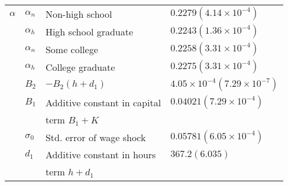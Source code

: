 \documentclass[10pt, letterpaper]{article}
\begin{document}
\begin{longtable}{c l l l}
    $\alpha$ &   $\alpha_n $ &   Non-high school  &  $ 0.2279 (4.14 \times 10^{-4})$\\
    {} &   $ \alpha_h $&  High school graduate  &  $0.2243 (1.36  \times 10^{-4}) $\\
    {} &   $ \alpha_n$ &  Some college  & $ 0.2258 (3.31  \times 10^{-4})$ \\
    {} &   $\alpha_h $&  College graduate  &  $ 0.2275 (3.31  \times 10^{-4})$\\
    {} &   $B_2$ &  $-B_2(h+d_1)$  &  $4.05  \times 10^{-4} (7.29  \times 10^{-7}) $\\
    {} &   $B_1$  & Additive constant in capital &  $ 0.04021 (7.29  \times 10^{-4})$\\
      {} & {} &  term $B_1+K$   & {} \\
    {} &   $\sigma_0$ &  Std. error of wage shock  &  $0.05781 (6.05  \times 10^{-4}) $\\
    {} &   $d_1$  &  Additive constant in hours &  $367.2 (6.035) $\\
     {} & {} &  term $h+d_1$  & {} \\


\end{longtable}
\end{document}
